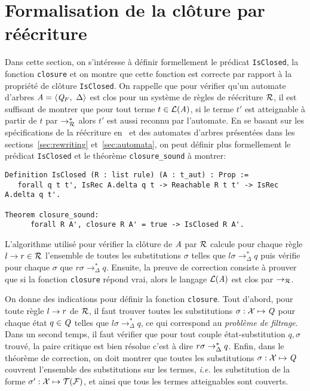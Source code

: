 
\section{Formalisation de la clôture par réécriture}
\label{sec:closure}

Dans cette section, on s'intéresse à définir formellement le prédicat \lstinline!IsClosed!, la fonction 
\lstinline!closure! et on montre que cette fonction est correcte par rapport à la propriété de clôture
\lstinline!IsClosed!. On rappelle que pour vérifier qu'un automate d'arbres $\mathit A = \langle \mathit Q_F,\ \Delta \rangle$ est
clos pour un système de règles de réécriture $\mathcal R$, il est suffisant de montrer que pour tout terme $t \in \mathcal{L}(\mathit A)$, si
le terme $t'$ est atteignable à partir de $t$ par $\rightarrow_\mathcal R^*$ alors $t'$ est aussi reconnu par l'automate. 
En se basant sur les spécifications de la réécriture en \coq\ et des automates d'arbres présentées dans les sections~\ref{sec:rewriting}
et~\ref{sec:automata}, on peut définir plus formellement le prédicat \lstinline!IsClosed! et le théorème \lstinline!closure_sound! à montrer:

\begin{lstlisting}
Definition IsClosed (R : list rule) (A : t_aut) : Prop :=
   forall q t t', IsRec A.delta q t -> Reachable R t t' -> IsRec A.delta q t'.

Theorem closure_sound:
      forall R A', closure R A' = true -> IsClosed R A'.
\end{lstlisting}


L'algorithme utilisé pour vérifier la clôture de  $\mathit A$ par $\mathcal R$ calcule pour chaque règle $l \rightarrow r \in \mathcal R$
l'ensemble de toutes les substitutions $\sigma$ telles que $l\sigma
\rightarrow_\Delta^* q$ puis vérifie pour chaque $\sigma$ que $r\sigma \rightarrow_\Delta^*q$.
Ensuite, la preuve de correction consiste à prouver que si la fonction \lstinline!closure!
répond vrai, alors le langage $\mathcal{L}(\mathit A)$ est clos par $\rightarrow_\mathcal R$.

On donne des indications pour définir la fonction \lstinline!closure!.  Tout d'abord, pour
toute règle $l \rightarrow r$ de $\mathcal R$, il faut trouver toutes les substitutions
$\sigma:\mathcal X \mapsto \mathit Q$ pour chaque état $q \in \mathit Q$ telles que
$l\sigma \rightarrow_\Delta^* q$, ce qui correspond au \emph{problème de filtrage}.
Dans un second temps, il faut vérifier que pour tout couple état-substitution $q, \sigma$ trouvé,
la paire critique est bien résolue c'est à dire $r\sigma \rightarrow_{\Delta}^* q$. 
Enfin, dans le théorème de correction, on doit montrer que toutes les substitutions $\sigma:
\mathcal X\mapsto \mathit Q$ couvrent l'ensemble des substitutions sur les termes, \textit{i.e.} les substitution de la forme $\sigma':
\mathcal X \mapsto \mathcal{T(F)}$, et ainsi que tous les termes atteignables sont couverts.

